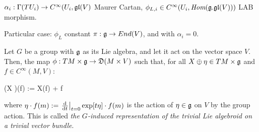 \begin{example}
$\alpha_i: \Gamma(TU_i) \to C^\infty(U_i, \mathfrak{gl}(V)$ Maurer Cartan, $\phi_{L, i} \in C^\infty(U_i, \Hom(\alg g. \alg{gl}(V)))$ LAB morphism.
\end{example}


\begin{example}
Particular case: $\phi_L$ constant $\pi: \mathfrak{g} \to End(V)$, and with $\alpha_i = 0$.

Let $G$ be a group with $\mathfrak{g}$ as its Lie algebra, and let it act on the vector space $V$. Then, the map $\phi: TM \times \alg g \to \alg D(M \times V)$ such that, for all $X \oplus \eta \in TM \times \mathfrak{g}$ and $f \in C^\infty(M, V)$:
\begin{eqnsplit}
    \phi(X \oplus \eta)(f) := X(f) + \eta \cdot f
\end{eqnsplit}
where $\eta \cdot f(m) := \der{t}[t=0]{\exp[t \eta] \cdot f(m)}$ is the action of $\eta \in \mathfrak{g}$ on $V$ by the group action. This is called \emph{the $G$-induced representation of the trivial Lie algebroid on a trivial vector bundle}.
\end{example}



